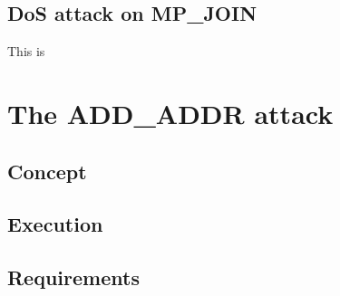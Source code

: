\subsection{DoS attack on MP\_JOIN}
This is 


\section{The ADD\_ADDR attack} \label{theaddaddrattack}
\subsection{Concept}

\subsection{Execution}
\subsection{Requirements}

